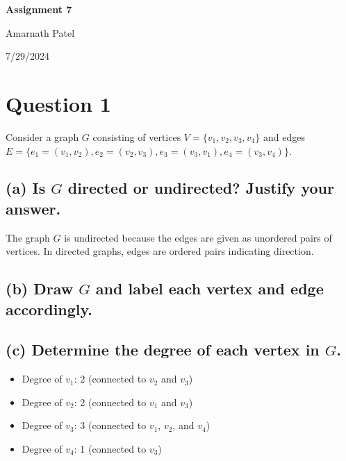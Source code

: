\documentclass{article}
\begin{document}
\begin{titlepage}
    \centering
    \vspace*{2cm}
    {\Huge\bfseries Assignment 7\par}
    \vspace{2cm}
    {\Large Amarnath Patel\par}
    \vfill
    {\large 7/29/2024 \par}
\end{titlepage}

\section*{Question 1}

Consider a graph \( G \) consisting of vertices \( V = \{v_1, v_2, v_3, v_4\} \) and edges \( E = \{e_1 = (v_1, v_2), e_2 = (v_2, v_3), e_3 = (v_3, v_1), e_4 = (v_3, v_4)\} \).

\subsection*{(a) Is \( G \) directed or undirected? Justify your answer.}
The graph \( G \) is undirected because the edges are given as unordered pairs of vertices. In directed graphs, edges are ordered pairs indicating direction.

\subsection*{(b) Draw \( G \) and label each vertex and edge accordingly.}
\begin{center}
\end{center}

\subsection*{(c) Determine the degree of each vertex in \( G \).}
\begin{itemize}
    \item Degree of \( v_1 \): 2 (connected to \( v_2 \) and \( v_3 \))
    \item Degree of \( v_2 \): 2 (connected to \( v_1 \) and \( v_3 \))
    \item Degree of \( v_3 \): 3 (connected to \( v_1 \), \( v_2 \), and \( v_4 \))
    \item Degree of \( v_4 \): 1 (connected to \( v_3 \))
\end{itemize}
\end{document}
